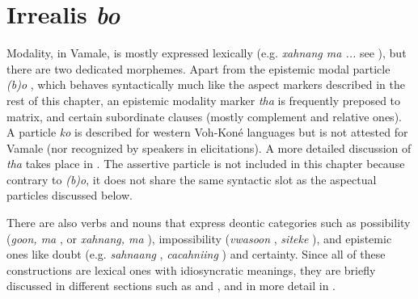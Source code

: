 
\section{Irrealis \textit{bo}}
\label{sec:bo} 
Modality, in Vamale, is mostly expressed lexically (e.g. \textit{xahnang ma ...}  see ), but there are two dedicated morphemes. Apart from the epistemic modal particle \textit{(b)o} , which behaves syntactically much like the aspect markers described in the rest of this chapter, an epistemic modality marker \textit{tha}  is frequently preposed to matrix, and certain subordinate clauses (mostly complement and relative ones). A particle \textit{ko}  is described for western Voh-Koné languages \parencite[55]{rivierre_bwatoo_2006} but is not attested for Vamale (nor recognized by speakers in elicitations). A more detailed discussion of \textit{tha}  takes place in . The assertive particle is not included in this chapter because contrary to \textit{(b)o}, it does not share the same syntactic slot as the aspectual particles discussed below.

There are also verbs and nouns that express deontic categories such as possibility (\textit{goon, ma} , or \textit{xahnang, ma} ), impossibility (\textit{vwasoon} , \textit{siteke} ), and epistemic ones like doubt (e.g. \textit{sahnaang} , \textit{cacahniing} ) and certainty. Since all of these constructions are lexical ones with idiosyncratic meanings, they are briefly discussed in different sections such as  and , and in more detail in . 
 
